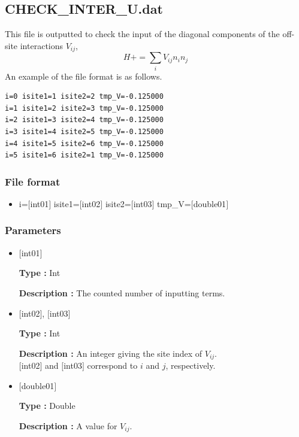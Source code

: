 \newpage
\subsection{CHECK\_INTER\_U.dat}
This file is outputted to check the input of the diagonal components of the off-site interactions $V_{ij}$,
\begin{equation}
H+=\sum_{i} V_{ij} n_{i} n_{j}
\end{equation}
An example of the file format is as follows.

\begin{minipage}{12.5cm}
\begin{screen}
\begin{verbatim}
i=0 isite1=1 isite2=2 tmp_V=-0.125000 
i=1 isite1=2 isite2=3 tmp_V=-0.125000 
i=2 isite1=3 isite2=4 tmp_V=-0.125000 
i=3 isite1=4 isite2=5 tmp_V=-0.125000 
i=4 isite1=5 isite2=6 tmp_V=-0.125000 
i=5 isite1=6 isite2=1 tmp_V=-0.125000 
\end{verbatim}
\end{screen}
\end{minipage}

\subsubsection{File format}
 \begin{itemize}
   \item  i=$[$int01$]$ isite1=$[$int02$]$ isite2=$[$int03$]$ tmp\_V=$[$double01$]$ 
 \end{itemize}
 
\subsubsection{Parameters}
 \begin{itemize}

    \item  $[$int01$]$ 
   
    {\bf Type :} Int

   {\bf Description :} The counted number of inputting terms.
      
   \item  $[$int02$]$, $[$int03$]$
   
    {\bf Type :} Int

    {\bf Description :}  An integer giving the site index of $V_{ij}$. \\
    $[$int02$]$ and $[$int03$]$ correspond to $i$ and $j$, respectively.
 
   \item  $[$double01$]$ 
   
    {\bf Type :} Double

   {\bf Description :} A value for $V_{ij}$.
\end{itemize}


